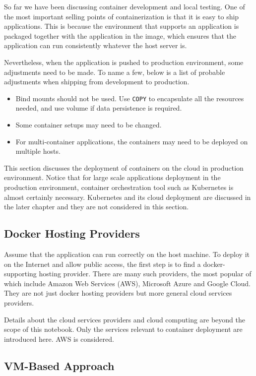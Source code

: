 So far we have been discussing container development and local testing. One of the most important selling points of containerization is that it is easy to ship applications. This is because the environment that supports an application is packaged together with the application in the image, which ensures that the application can run consistently whatever the host server is. 

Nevertheless, when the application is pushed to production environment, some adjustments need to be made. To name a few, below is a list of probable adjustments when shipping from development to production.

\begin{itemize}
	\item Bind mounts should not be used. Use \verb|COPY| to encapsulate all the resources needed, and use volume if data persistence is required.
	\item Some container setups may need to be changed.
	\item For multi-container applications, the containers may need to be deployed on multiple hosts.
\end{itemize}

This section discusses the deployment of containers on the cloud in production environment. Notice that for large scale applications deployment in the production environment, container orchestration tool such as Kubernetes is almost certainly necessary. Kubernetes and its cloud deployment are discussed in the later chapter and they are not considered in this section. 

\subsection{Docker Hosting Providers}

Assume that the application can run correctly on the host machine. To deploy it on the Internet and allow public access, the first step is to find a docker-supporting hosting provider. There are many such providers, the most popular of which include Amazon Web Services (AWS), Microsoft Azure and Google Cloud. They are not just docker hosting providers but more general cloud services providers.

Details about the cloud services providers and cloud computing are beyond the scope of this notebook. Only the services relevant to container deployment are introduced here. AWS is considered.

\subsection{VM-Based Approach}

